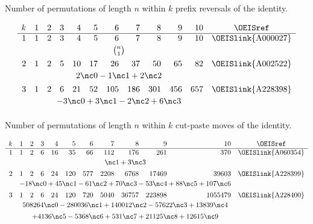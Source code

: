 \documentclass[12pt,twoside]{memoir}
\begin{document}
      \begin{table}[t]
      \caption{Number of permutations of length $n$ within $k$ prefix reversals of the
      identity.}
      \begin{footnotesize}
      $$
      \begin{array}{rrrrrrrrrrrc}
      k &1&2&3&4&5&6&7&8&9&10&\text{\OEISref}\\\hline
      1&1&2&3&4&5&6&7&8&9&10&\text{\OEISlink{A000027}}\\[0.5ex]
      &\multicolumn{10}{c}{{n\choose 1}}&\\[1ex]
      2&1&2&5&10&17&26&37&50&65&82&\text{\OEISlink{A002522}}\\[0.5ex]
      &\multicolumn{10}{c}{2 \nc0 -1 \nc1 + 2\nc2  }&\\[1ex]
      3&1&2&6&21&52&105&186&301&456&657&\text{\OEISlink{A228398}}\\[0.5ex]
      &\multicolumn{10}{c}{ -3 \nc0 + 3 \nc1 - 2\nc2 + 6\nc3}&\\[1ex]
      \end{array}
      $$
      \end{footnotesize}
      \end{table}


      \begin{table}[t]
      \caption{Number of permutations of length $n$ within $k$ cut-paste moves of the
      identity.}
      \begin{footnotesize}
      $$
      \begin{array}{rrrrrrrrrrrc}
      k &1&2&3&4&5&6&7&8&9&10&\text{\OEISref}\\\hline
      1&1&2&6&16&35&66&112&176&261&370&\text{\OEISlink{A060354}}\\[0.5ex]
      &\multicolumn{10}{c}{\nc1 + 3\nc3 }&\\[1ex]
      2&1&2&6&24&120&577&2208&6768&17469&39603&\text{\OEISlink{A228399}}\\[0.5ex]
      &\multicolumn{10}{c}{-18\nc0 + 45\nc1 - 61\nc2 + 70\nc3 - 53\nc4 + 88\nc5
      + 107\nc6}&\\[1ex]
      3&1&2&6&24&120&720&5040&36757&223898&1055479&\text{\OEISlink{A228400}}\\[0.5ex]
      &\multicolumn{10}{c}{508264\nc0 - 280036\nc1 + 140012\nc2 - 57622\nc3 +
      13839\nc4}&\\[1ex]
      &\multicolumn{10}{c}{+ 4136\nc5-5368\nc6 + 531\nc7 + 21125\nc8 +
      12615\nc9} \\ 
      \end{array}
      $$
      \end{footnotesize}
      \end{table}
    
\end{document}
